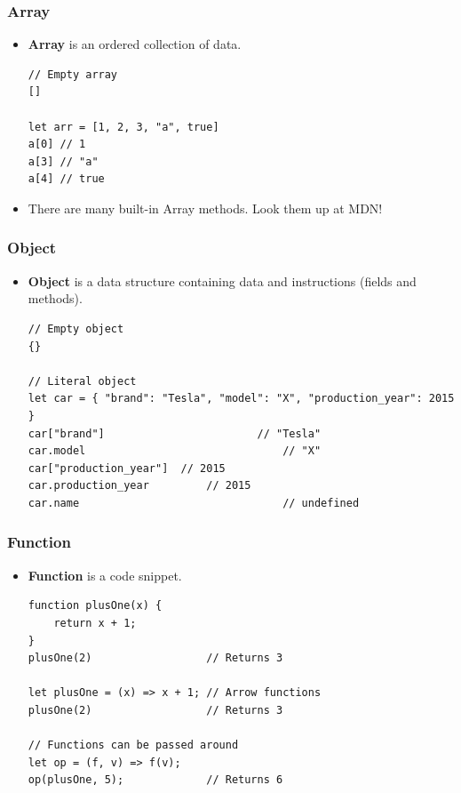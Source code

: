 \documentclass[handout,12pt]{beamer}
\begin{document}
\begin{frame}[fragile]
	\frametitle{Array}
	\begin{itemize}
		\item \textbf{Array} is an ordered collection of data.
		\begin{verbatim}
// Empty array
[]						

let arr = [1, 2, 3, "a", true]
a[0] // 1
a[3] // "a"
a[4] // true
		\end{verbatim}
		\item There are many built-in Array methods. Look them up at MDN!
	\end{itemize}
\end{frame}

\begin{frame}[fragile]
	\frametitle{Object}
	\begin{itemize}
		\item \textbf{Object} is a data structure containing data and instructions (fields and methods).
		\begin{verbatim}
// Empty object
{}
														
// Literal object
let car = { "brand": "Tesla", "model": "X", "production_year": 2015 } 
car["brand"]						// "Tesla"
car.model								// "X"
car["production_year"]	// 2015
car.production_year			// 2015
car.name								// undefined
		\end{verbatim}
	\end{itemize}
\end{frame}

\begin{frame}[fragile]
	\frametitle{Function}
	\begin{itemize}
		\item \textbf{Function} is a code snippet.
		\begin{verbatim}
function plusOne(x) {
	return x + 1;
}
plusOne(2)                  // Returns 3

let plusOne = (x) => x + 1; // Arrow functions
plusOne(2)                  // Returns 3

// Functions can be passed around
let op = (f, v) => f(v);
op(plusOne, 5);             // Returns 6
		\end{verbatim}
	\end{itemize}
\end{frame}
\end{document}
